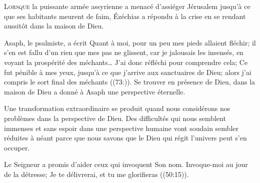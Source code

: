 




\lettrine{L}{orsque} la puissante armée assyrienne a menacé d'assiéger
 Jérusalem jusqu'à ce que ses habitants meurent de faim,
 Ézéchias a répondu à la crise en se rendant aussitôt
 dans la maison de Dieu. 


Asaph, le psalmiste, a écrit\frcolon{} 
 \Og Quant à moi, pour un peu mes pieds allaient fléchir;
 il s’en est fallu d’un rien que mes pas ne glissent,
 car je jalousais les insensés, en voyant la prospérité des méchants\dots{}
 J’ai donc réfléchi pour comprendre cela; Ce fut pénible à mes yeux,
 jusqu’à ce que j’arrive aux sanctuaires de Dieu;
 alors j’ai compris le sort final des méchants \Fg{} ((73:)).
 Se trouver en présence de Dieu, dans la maison de Dieu
 a donné à Asaph une perspective éternelle. 

Une transformation extraordinaire se produit quand nous considérons
 nos problèmes dans la perspective de Dieu.
 Des difficultés qui nous semblent immenses et sans espoir
 dans une perspective humaine vont soudain sembler réduites à néant
 \ocadr parce que nous savons que le Dieu qui régit l'univers
 peut s'en occuper. 

Le Seigneur a promis d'aider ceux qui invoquent Son nom.
 \Og Invoque-moi au jour de la détresse; Je te délivrerai,
 et tu me glorifieras \Fg{} ((50:15)).

\dvrule






